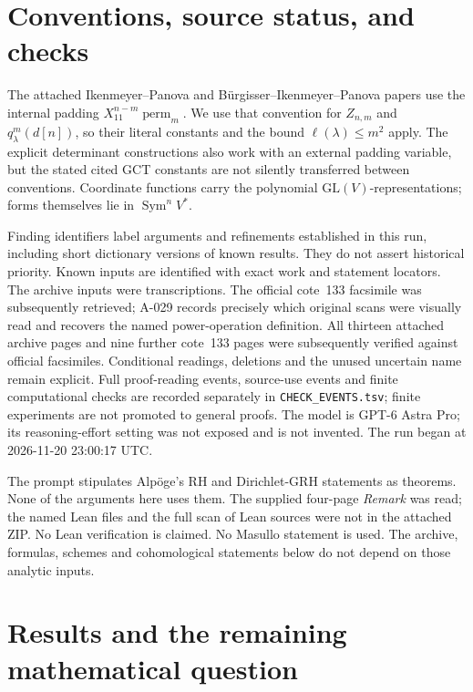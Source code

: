 \documentclass[11pt]{article}
\begin{document}
\section*{Conventions, source status, and checks}
The attached Ikenmeyer--Panova and B\"urgisser--Ikenmeyer--Panova papers
use the internal padding \(X_{11}^{n-m}\operatorname{perm}_m\).
We use that convention for \(Z_{n,m}\) and \(q^m_\lambda(d[n])\),
so their literal constants and the bound \(\ell(\lambda)\leq m^2\)
apply. The explicit determinant constructions also work with an external
padding variable, but the stated cited GCT constants are not silently
transferred between conventions. Coordinate functions carry the polynomial
\(\mathrm{GL}(V)\)-representations; forms themselves lie in
\(\operatorname{Sym}^n V^*\).

Finding identifiers label arguments and refinements established in this
run, including short dictionary versions of known results. They do not
assert historical priority. Known inputs are identified with exact work
and statement locators. The archive inputs were transcriptions. The official cote~133 facsimile
was subsequently retrieved; A-029 records precisely which original
scans were visually read and recovers the named power-operation definition.
All thirteen attached archive pages and nine further cote~133 pages
were subsequently verified against official facsimiles. Conditional
readings, deletions and the unused uncertain name remain explicit. Full proof-reading events, source-use events
and finite computational checks are recorded separately in
\texttt{CHECK\_EVENTS.tsv}; finite experiments are not promoted to general
proofs. The model is GPT-6 Astra Pro; its reasoning-effort setting was not
exposed and is not invented. The run began at 2026-11-20 23:00:17 UTC.

The prompt stipulates Alp\"oge's RH and Dirichlet-GRH statements as
theorems. None of the arguments here uses them. The supplied four-page
\emph{Remark} was read; the named Lean files and the full scan of Lean
sources were not in the attached ZIP. No Lean verification is claimed.
No Masullo statement is used. The archive, formulas, schemes and
cohomological statements below do not depend on those analytic inputs.
\clearpage
\tableofcontents
\clearpage
\section*{Results and the remaining mathematical question}
\end{document}
